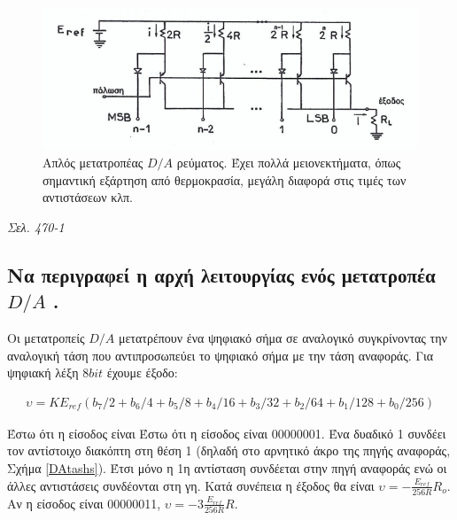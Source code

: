 \documentclass{article}
\begin{document}
\begin{figure}[h!]
    \includegraphics[width=\linewidth]{DArevma.png}
    \caption{Απλός μετατροπέας $D/A$ ρεύματος. Έχει πολλά μειονεκτήματα, όπως σημαντική εξάρτηση από θερμοκρασία, μεγάλη διαφορά στις τιμές των αντιστάσεων κλπ.}
    \label{DArevmatos}
\end{figure}

\emph{Σελ. 470-1}

\subsection{Να περιγραφεί η αρχή λειτουργίας ενός μετατροπέα $D/A$ .}
Οι μετατροπείς $D/A$ μετατρέπουν ένα ψηφιακό σήμα σε αναλογικό συγκρίνοντας την αναλογική τάση που αντιπροσωπεύει το ψηφιακό σήμα με την τάση αναφοράς. Για ψηφιακή λέξη $8bit$ έχουμε
έξοδο: 

\begin{align*}
    \upsilon = K E_{ref} \left( b_7/2 + b_6/4 + b_5/8 + b_4/16 +b_3/32 + b_2/64 + b_1/128 + b_0/256 \right)
\end{align*}

Έστω ότι η είσοδος είναι Έστω ότι η είσοδος είναι 00000001. Ένα δυαδικό 1 συνδέει τον αντίστοιχο διακόπτη στη θέση 1 (δηλαδή στο αρνητικό άκρο της πηγής αναφοράς, Σχήμα \ref{DAtashs}). Έτσι
μόνο η 1η αντίσταση συνδέεται στην πηγή αναφοράς ενώ οι άλλες αντιστάσεις συνδέονται στη γη. Κατά συνέπεια η έξοδος θα είναι $\upsilon = -\frac{E_{ref}}{256R}R_o$. Αν η είσοδος είναι
00000011, $\upsilon = -3\frac{E_{ref}}{256R}R$.
\end{document}
